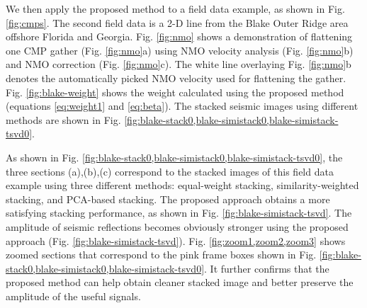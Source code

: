 We then apply the proposed method to a field data example, as shown in Fig. \ref{fig:cmps}. The second field data is a 2-D line from the Blake Outer Ridge area offshore Florida and Georgia.  Fig. \ref{fig:nmo} shows a demonstration of flattening one CMP gather (Fig. \ref{fig:nmo}a) using NMO velocity analysis (Fig. \ref{fig:nmo}b) and NMO correction (Fig. \ref{fig:nmo}c). The white line overlaying Fig. \ref{fig:nmo}b denotes the automatically picked NMO velocity used for flattening the gather.  Fig. \ref{fig:blake-weight} shows the weight calculated using the proposed method (equations \ref{eq:weight1} and \ref{eq:beta}). The stacked seismic images using different methods are shown in Fig. \ref{fig:blake-stack0,blake-simistack0,blake-simistack-tsvd0}. 

As shown in Fig. \ref{fig:blake-stack0,blake-simistack0,blake-simistack-tsvd0}, the three sections (a),(b),(c) correspond to the stacked images of this field data example using three different methods: equal-weight stacking, similarity-weighted stacking, and PCA-based stacking. The proposed approach obtains a more satisfying stacking performance, as shown in Fig. \ref{fig:blake-simistack-tsvd}. The amplitude of seismic reflections becomes obviously stronger using the proposed approach (Fig. \ref{fig:blake-simistack-tsvd}). Fig. \ref{fig:zoom1,zoom2,zoom3} shows zoomed sections that correspond to the pink frame boxes shown in Fig. \ref{fig:blake-stack0,blake-simistack0,blake-simistack-tsvd0}. It further confirms that the proposed method can help obtain cleaner stacked image and better preserve the amplitude of the useful signals. 


